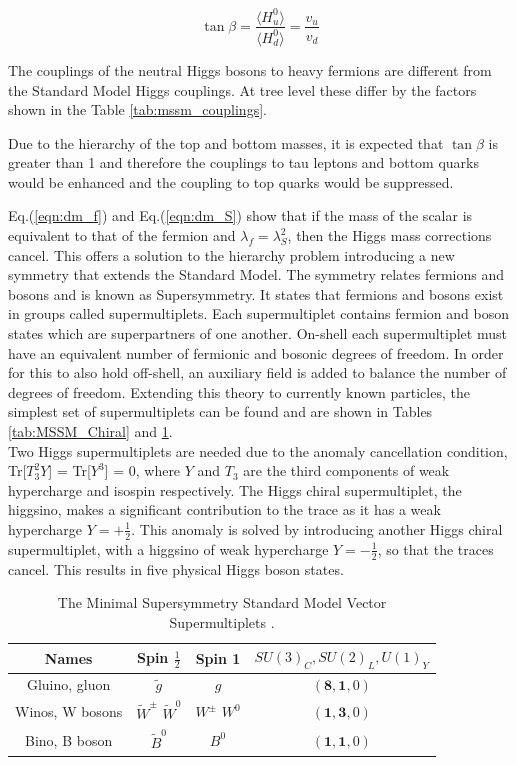 \begin{equation}
\tan \beta = \frac{\langle H_{u}^{0} \rangle}{\langle H_{d}^{0} \rangle} = \frac{v_{u}}{v_{d}}
\end{equation}

The couplings of the neutral Higgs bosons to heavy fermions are different from the Standard Model Higgs couplings. At tree level these differ by the factors shown in the Table \ref{tab:mssm_couplings}.

Due to the hierarchy of the top and bottom masses, it is expected that $\tan\beta$ is greater than 1 and therefore the couplings to tau leptons and bottom quarks would be enhanced and the coupling to top quarks would be suppressed.

Eq.(\ref{eqn:dm_f}) and Eq.(\ref{eqn:dm_S}) show that if the mass of the scalar is equivalent to that of the fermion and \(\lambda_f = \lambda_{S}^{2}\), then the Higgs mass corrections cancel. This offers a solution to the hierarchy problem introducing a new symmetry that extends the Standard Model. The symmetry relates fermions and bosons and is known as Supersymmetry. It states that fermions and bosons exist in groups called supermultiplets. Each supermultiplet contains fermion and boson states which are superpartners of one another. On-shell each supermultiplet must have an equivalent number of fermionic and bosonic degrees of freedom. In order for this to also hold off-shell, an auxiliary field is added to balance the number of degrees of freedom. Extending this theory to currently known particles, the simplest set of supermultiplets can be found and are shown in Tables \ref{tab:MSSM_Chiral} and \ref{tab:MSSM_vector}. \\

Two Higgs supermultiplets are needed due to the anomaly cancellation condition, Tr[\(T_{3}^{2}Y\)] = Tr[\(Y^3\)] = 0, where \(Y\) and \(T_3\) are the third components of weak hypercharge and isospin respectively. The Higgs chiral supermultiplet, the higgsino, makes a significant contribution to the trace as it has a weak hypercharge \(Y=+\frac{1}{2}\). This anomaly is solved by introducing another Higgs chiral supermultiplet, with a higgsino of weak hypercharge \(Y=-\frac{1}{2}\), so that the traces cancel. This results in five physical Higgs boson states. 

\begin{table}[H]
\centering
\begin{tabular}{|c||ccc|}
     \hline
     Names & Spin \(\frac{1}{2}\) & Spin 1 & \(SU(3)_C, SU(2)_L, U(1)_Y \)\\
     \hline
     \hline
     Gluino, gluon & \(\tilde{g}\) & \(g\) & \((\textbf{8},\textbf{1},0)\) \\
     Winos, W bosons & \(\tilde{W}^{\pm}\) \(\tilde{W}^{0}\) & \(W^{\pm}\) \(W^0\) & \((\textbf{1},\textbf{3},0)\) \\
     Bino, B boson & \(\tilde{B}^{0}\) & \(B^0\) & \((\textbf{1},\textbf{1},0)\) \\
     \hline
\end{tabular}
\caption{The Minimal Supersymmetry Standard Model Vector Supermultiplets \cite{SUSY_Primer}.}
\label{tab:MSSM_vector}
\end{table}


